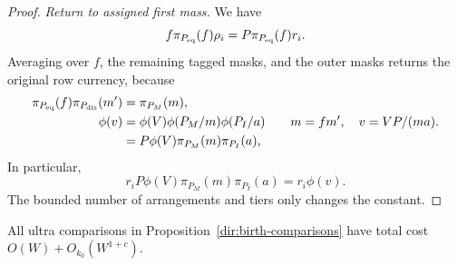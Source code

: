 \begin{proof}
\emph{Return to assigned first mass.}
We have
\[
 f\pi_{P_{\rm eq}}(f)\rho_i
       =P\pi_{P_{\rm eq}}(f)r_i.
\]
Averaging over $f$, the remaining tagged masks, and the outer masks
returns the original row currency, because
\[
 \begin{aligned}
 \pi_{P_{\rm eq}}(f)\pi_{P_{\rm dis}}(m')&=\pi_{P_M}(m),\\
 \phi(v)&=\phi(V)\phi(P_M/m)\phi(P_I/a)\\
        &=P\phi(V)\pi_{P_M}(m)\pi_{P_I}(a),
 \end{aligned}
 \qquad m=fm',
 \quad v=VP/(ma).
\]
In particular,
\[
 r_iP\phi(V)\pi_{P_M}(m)\pi_{P_I}(a)=r_i\phi(v).
\]
The bounded number of arrangements and tiers only changes the constant.
\end{proof}

\begin{lemma}\label{dir:ultra-count}
All ultra comparisons in Proposition~\ref{dir:birth-comparisons} have
total cost $O(W)+O_{k_0}(W^{1+c})$.
\end{lemma}

